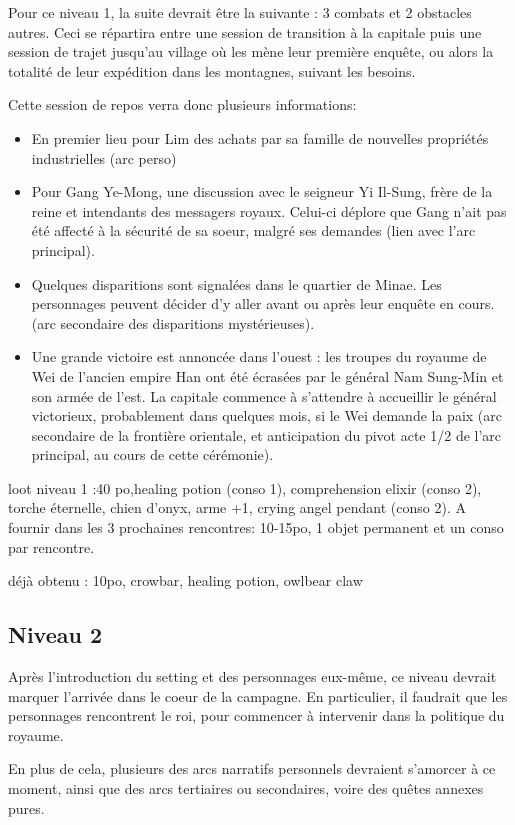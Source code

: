 \documentclass[10pt,a4paper]{book}
\begin{document}
Pour ce niveau 1, la suite devrait être la suivante : 3 combats et 2 obstacles autres. Ceci se répartira entre une session de transition à la capitale puis une session de trajet jusqu'au village où les mène leur première enquête, ou alors la totalité de leur expédition dans les montagnes, suivant les besoins.

Cette session de repos verra donc plusieurs informations:
\begin{itemize}
\item En premier lieu pour Lim des achats par sa famille de nouvelles propriétés industrielles (arc perso)
\item Pour Gang Ye-Mong, une discussion avec le seigneur Yi Il-Sung, frère de la reine et intendants des messagers royaux. Celui-ci déplore que Gang n'ait pas été affecté à la sécurité de sa soeur, malgré ses demandes (lien avec l'arc principal).
\item Quelques disparitions sont signalées dans le quartier de Minae. Les personnages peuvent décider d'y aller avant ou après leur enquête en cours. (arc secondaire des disparitions mystérieuses).
\item Une grande victoire est annoncée dans l'ouest : les troupes du royaume de Wei de l'ancien empire Han ont été écrasées par le général Nam Sung-Min et son armée de l'est. La capitale commence à s'attendre à accueillir le général victorieux, probablement dans quelques mois, si le Wei demande la paix (arc secondaire de la frontière orientale, et anticipation du pivot acte 1/2 de l'arc principal, au cours de cette cérémonie).
\end{itemize}

loot niveau 1 :40 po,healing potion (conso 1), comprehension elixir (conso 2), torche éternelle, chien d'onyx, arme +1, crying angel pendant (conso 2). A fournir dans les 3 prochaines rencontres:
10-15po, 1 objet permanent et un conso par rencontre.

déjà obtenu : 10po, crowbar, healing potion, owlbear claw
\subsection{Niveau 2}
Après l'introduction du setting et des personnages eux-même, ce niveau devrait marquer l'arrivée dans le coeur de la campagne. En particulier, il faudrait que les personnages rencontrent le roi, pour commencer à intervenir dans la politique du royaume.

En plus de cela, plusieurs des arcs narratifs personnels devraient s'amorcer à ce moment, ainsi que des arcs tertiaires ou secondaires, voire des quêtes annexes pures.
\end{document}
